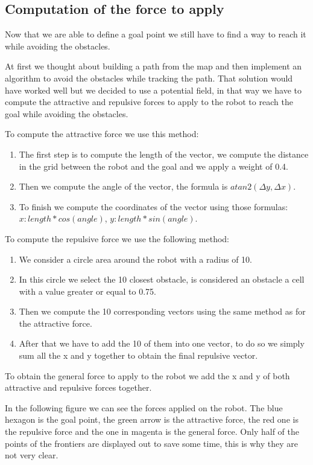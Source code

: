 \subsection{Computation of the force to apply}

Now that we are able to define a goal point we still have to find a way to reach it while avoiding the obstacles.

At first we thought about building a path from the map and then implement an algorithm to avoid the obstacles while tracking the path.
That solution would have worked well but we decided to use a potential field, in that way we have to compute the attractive and repulsive forces to apply to the robot to reach the goal while avoiding the obstacles.

To compute the attractive force we use this method:

\begin{enumerate}
    \item The first step is to compute the length of the vector, we compute the distance in the grid between the robot and the goal and we apply a weight of 0.4.
    \item Then we compute the angle of the vector, the formula is $atan2(\Delta y, \Delta x)$.
    \item To finish we compute the coordinates of the vector using those formulas: $x: length * cos(angle)$, $y: length * sin(angle)$.
\end{enumerate}

To compute the repulsive force we use the following method:

\begin{enumerate}
    \item We consider a circle area around the robot with a radius of 10.
    \item In this circle we select the 10 closest obstacle, is considered an obstacle a cell with a value greater or equal to 0.75.
    \item Then we compute the 10 corresponding vectors using the same method as for the attractive force.
    \item After that we have to add the 10 of them into one vector, to do so we simply sum all the x and y together to obtain the final repulsive vector.
\end{enumerate}

To obtain the general force to apply to the robot we add the x and y of both attractive and repulsive forces together.

In the following figure we can see the forces applied on the robot.
The blue hexagon is the goal point, the green arrow is the attractive force, the red one is the repulsive force and the one in magenta is the general force.
Only half of the points of the frontiers are displayed out to save some time, this is why they are not very clear.

